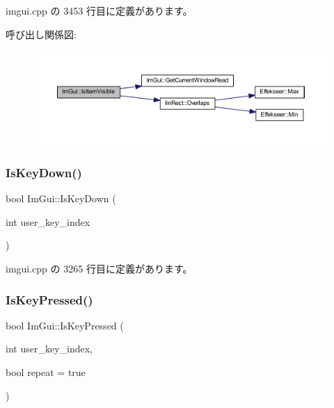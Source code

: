  imgui.\+cpp の 3453 行目に定義があります。

呼び出し関係図\+:\nopagebreak
\begin{figure}[H]
\begin{center}
\leavevmode
\includegraphics[width=350pt]{namespace_im_gui_a0e9273fc53bdf7ca39d59cdb657c3c2f_cgraph}
\end{center}
\end{figure}
\mbox{\label{namespace_im_gui_a633d848504c89e7756ddd33474bc78d2}} 
\subsubsection{\texorpdfstring{Is\+Key\+Down()}{IsKeyDown()}}
{\footnotesize\ttfamily bool Im\+Gui\+::\+Is\+Key\+Down (\begin{DoxyParamCaption}\item[{int}]{user\+\_\+key\+\_\+index }\end{DoxyParamCaption})}



 imgui.\+cpp の 3265 行目に定義があります。

\mbox{\label{namespace_im_gui_a83331a8afa5316bc98ed9c98b151ac01}} 
\subsubsection{\texorpdfstring{Is\+Key\+Pressed()}{IsKeyPressed()}}
{\footnotesize\ttfamily bool Im\+Gui\+::\+Is\+Key\+Pressed (\begin{DoxyParamCaption}\item[{int}]{user\+\_\+key\+\_\+index,  }\item[{bool}]{repeat = {\ttfamily true} }\end{DoxyParamCaption})}



